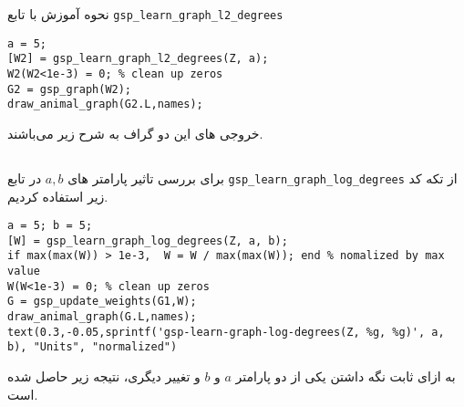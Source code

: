 نحوه آموزش با تابع
\verb|gsp_learn_graph_l2_degrees|

\begin{latin}
\begin{lstlisting}
a = 5;
[W2] = gsp_learn_graph_l2_degrees(Z, a);
W2(W2<1e-3) = 0; % clean up zeros
G2 = gsp_graph(W2);
draw_animal_graph(G2.L,names);
\end{lstlisting}
\end{latin}

خروجی های این دو گراف به شرح زیر می‌باشند.
\begin{figure}[h!]
	\centering
	\hfill
	\caption{}
\end{figure}
\FloatBarrier




\subsection{}


برای بررسی تاثیر پارامتر های $a,b$ در تابع 
\verb|gsp_learn_graph_log_degrees| 
از تکه کد زیر استفاده کردیم.

\begin{latin}
\begin{lstlisting}
a = 5; b = 5;
[W] = gsp_learn_graph_log_degrees(Z, a, b);
if max(max(W)) > 1e-3,  W = W / max(max(W)); end % nomalized by max value
W(W<1e-3) = 0; % clean up zeros
G = gsp_update_weights(G1,W);
draw_animal_graph(G.L,names);
text(0.3,-0.05,sprintf('gsp-learn-graph-log-degrees(Z, %g, %g)', a, b), "Units", "normalized")
\end{lstlisting}
\end{latin}

به ازای ثابت نگه داشتن یکی از دو پارامتر $a$ و $b$ و تغییر دیگری، نتیجه زیر حاصل شده است.


